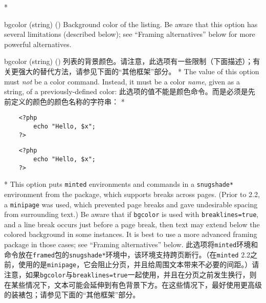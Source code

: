 \begin{optionlist}
\begin{paracol}{2}
\switchcolumn[0]*%

\item[bgcolor (string) (\meta{none})]
Background color of the listing.  Be aware that this option has several limitations (described below); see ``Framing alternatives'' below for more powerful alternatives.
\switchcolumn
\item[bgcolor (string) (\meta{无})]
列表的背景颜色。请注意，此选项有一些限制（下面描述）；有关更强大的替代方法，请参见下面的“其他框架”部分。
\switchcolumn[0]*%
The value of this option must \emph{not} be a color command. Instead, it must be a color \emph{name}, given as a string, of a previously-defined color:
\switchcolumn
此选项的值不能是颜色命令。而是必须是先前定义的颜色的颜色名称的字符串：
\switchcolumn[0]* 
\begin{example}
    \begin{verbatim}
    <?php
        echo "Hello, $x";
    ?>
    \end{verbatim}
\end{example}
\switchcolumn
\begin{example}
    \begin{verbatim}
    <?php
        echo "Hello, $x";
    ?>
    \end{verbatim}
\end{example}
\switchcolumn[0]*%
This option puts \texttt{minted} environments and \texttt{\string\mint} commands in a \texttt{snugshade*} environment from the  package, which supports breaks across pages.  (Prior to  2.2, a \texttt{minipage} was used, which prevented page breaks and gave undesirable spacing from surrounding text.)  Be aware that if \texttt{bgcolor} is used with \texttt{breaklines=true}, and a line break occurs just before a page break, then text may extend below the colored background in some instances.  It is best to use a more advanced framing package in those cases; see ``Framing alternatives'' below.
\switchcolumn
此选项将\texttt{minted}环境和\texttt{\string\mint}命令放在\texttt{framed}包的\texttt{snugshade*}环境中，该环境支持跨页断行。（在\texttt{minted} 2.2之前，使用的是\texttt{minipage}，它会阻止分页，并且给周围文本带来不必要的间距。）请注意，如果\texttt{bgcolor}与\texttt{breaklines=true}一起使用，并且在分页之前发生换行，则在某些情况下，文本可能会延伸到有色背景下方。在这些情况下，最好使用更高级的装裱包；请参见下面的“其他框架”部分。

\end{paracol}
\end{optionlist}

